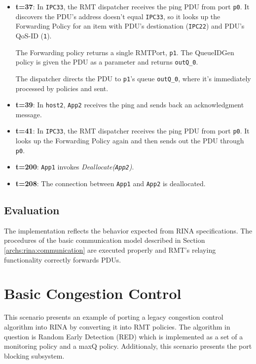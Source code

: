 \begin{itemize}
            \item \textbf{t=37}: In \texttt{IPC33}, the RMT dispatcher receives the ping PDU from port \texttt{p0}. It discovers the PDU's address doesn't equal \texttt{IPC33}, so it looks up the Forwarding Policy for an item with PDU's destionation (\texttt{IPC22}) and PDU's QoS-ID (\texttt{1}).

            The Forwarding policy returns a single RMTPort, \texttt{p1}. The QueueIDGen policy is given the PDU as a parameter and returns \texttt{outQ\_0}.

            The dispatcher directs the PDU to \texttt{p1}'s queue \texttt{outQ\_0}, where it's immediately processed by policies and sent.

            \item \textbf{t=39}: In \texttt{host2}, \texttt{App2} receives the ping and sends back an acknowledgment message.

            \item \textbf{t=41}: In \texttt{IPC33}, the RMT dispatcher receives the ping PDU from port \texttt{p0}. It looks up the Forwarding Policy again and then sends out the PDU through \texttt{p0}.

            \item \textbf{t=200}: \texttt{App1} invokes \emph{Deallocate(\texttt{App2})}.

            \item \textbf{t=208}: The connection between \texttt{App1} and \texttt{App2} is deallocated.
            \end{itemize}

        \subsection{Evaluation}

            The implementation reflects the behavior expected from RINA specifications. The procedures of the basic communication model described in Section \ref{archs:rina:communication} are executed properly and RMT's relaying functionality correctly forwards PDUs.


    \section{Basic Congestion Control}

        This scenario presents an example of porting a legacy congestion control algorithm into RINA by converting it into RMT policies. The algorithm in question is Random Early Detection (RED) which is implemented as a set of a monitoring policy and a maxQ policy. Additionaly, this scenario presents the port blocking subsystem.

